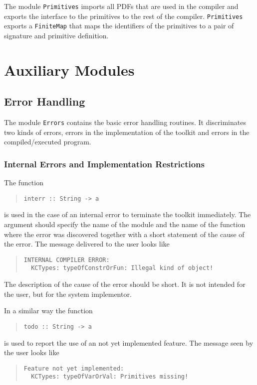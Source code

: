 \documentclass{report}
\newcommand{\code}[1]{\texttt{#1}}
\begin{document}
The module \code{Primitives} imports all PDFs that are used in the compiler and
exports the interface to the primitives to the rest of the
compiler. \code{Primitives} exports a \code{FiniteMap} that maps the
identifiers of the primitives to a pair of signature and primitive definition.

\chapter{Auxiliary Modules}
\label{cha:aux}

\section{Error Handling}

The module \code{Errors} contains the basic error handling routines. It
discriminates two kinds of errors, errors in the implementation of the toolkit
and errors in the compiled/executed program. 

\subsection{Internal Errors and Implementation Restrictions}

The function
%
\begin{quote}
\begin{verbatim}
interr :: String -> a
\end{verbatim}
\end{quote}
%
is used in the case of an internal error to terminate the toolkit
immediately. The argument should specify the name of the module and the name of
the function where the error was discovered together with a short statement of
the cause of the error. The message delivered to the user looks like
%
\begin{quote}
\begin{verbatim}
INTERNAL COMPILER ERROR:
  KCTypes: typeOfConstrOrFun: Illegal kind of object!
\end{verbatim}
\end{quote}
%
The description of the cause of the error should be short. It is not intended
for the user, but for the system implementor.

In a similar way the function
%
\begin{quote}
\begin{verbatim}
todo :: String -> a
\end{verbatim}
\end{quote}
%
is used to report the use of an not yet implemented feature. The message seen
by the user looks like
%
\begin{quote}
\begin{verbatim}
Feature not yet implemented:
  KCTypes: typeOfVarOrVal: Primitives missing!
\end{verbatim}
\end{quote}
\end{document}
